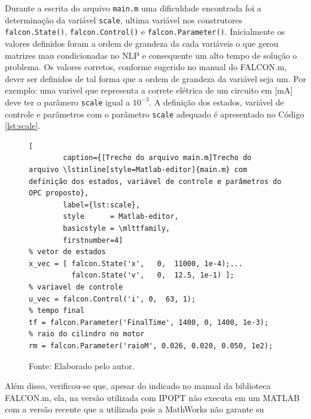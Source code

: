 Durante a escrita do arquivo \lstinline[style=Matlab-editor]{main.m} uma dificuldade encontrada foi a determinação da variável \lstinline[style=Matlab-editor]{scale}, 
ultima variável nos construtores \lstinline[style=Matlab-editor]{falcon.State()}, \lstinline[style=Matlab-editor]{falcon.Control()} e \lstinline[style=Matlab-editor]{falcon.Parameter()}.
Inicialmente os valores definidos foram a ordem de grandeza da cada variáveis o que gerou matrizes mau condicionadas no NLP e consequente um alto tempo de solução o problema. 
Os valores corretos, conforme sugerido no manual do FALCON.m\cite{manual:Falcon}, dever ser definidos de tal forma que a ordem de grandeza da variável seja um. Por exemplo: uma varivel que
representa a correte elétrica de um circuito em [mA] deve ter o parâmero \lstinline[style=Matlab-editor]{scale} igual a $10^{-3}$. 
A definição dos estados, variável de controle e parâmetros com o parâmetro \lstinline[style=Matlab-editor]{scale} adequado é apresentado no Código \ref{lst:scale}. 

\begin{figure}[h]
    \begin{lstlisting}[
        caption={[Trecho do arquivo main.m]Trecho do arquivo \lstinline[style=Matlab-editor]{main.m} com definição dos estados, variável de controle e parâmetros do OPC proposto}, 
        label={lst:scale},
        style      = Matlab-editor,
        basicstyle = \mlttfamily,
        firstnumber=4]
% vetor de estados
x_vec = [ falcon.State('x',   0,  11000, 1e-4);...
          falcon.State('v',   0,  12.5, 1e-1) ];
% variavel de controle
u_vec = falcon.Control('i', 0,  63, 1);
% tempo final
tf = falcon.Parameter('FinalTime', 1400, 0, 1400, 1e-3);
% raio do cilindro no motor
rm = falcon.Parameter('raioM', 0.026, 0.020, 0.050, 1e2);
    \end{lstlisting}
    \caption*{\footnotesize{Fonte: Elaborado pelo autor.}}
\end{figure}

Além disso, verificou-se que, apesar do indicado no manual da biblioteca FALCON.m\cite{manual:Falcon}, ela, na versão utilizada com IPOPT não executa em um MATLAB com a versão recente que a utilizada pois
a MathWorks não garante su








